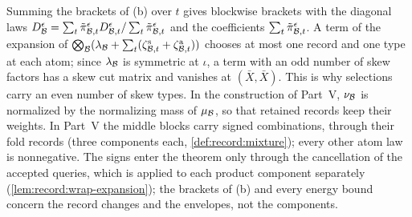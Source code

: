 Summing the brackets of (b) over $t$ gives blockwise brackets with the
diagonal laws $D^\epsilon_{\mathcal B}=\sum_t\tilde\pi^\epsilon_{\mathcal B,t}
D^\epsilon_{\mathcal B,t}/\sum_t\tilde\pi^\epsilon_{\mathcal B,t}$ and the coefficients
$\sum_t\tilde\pi^\epsilon_{\mathcal B,t}$. A term of the expansion of
$\bigotimes_{\mathcal B}(\lambda_{\mathcal B}+\sum_t(\zeta^{\rm s}_{\mathcal B,t}+\zeta^{\rm
a}_{\mathcal B,t}))$ chooses at most one record and one type at each atom; since
$\lambda_{\mathcal B}$ is symmetric at $\iota$, a term with an odd number of skew
factors has a skew cut matrix and vanishes at $(\bar X,\bar X)$. This is why
selections carry an even number of skew types. In the construction of
Part~V, $\nu_{\mathcal B}$ is normalized by the normalizing mass of $\mu_{\mathcal B}$, so
that retained records keep their weights. In Part~V the middle blocks carry
signed combinations, through their fold records (three components each,
\cref{def:record:mixture}); every other atom law is nonnegative. The signs
enter the theorem only through the cancellation of the accepted queries,
which is applied to each product component separately
(\cref{lem:record:wrap-expansion}); the brackets of (b) and every energy
bound concern the record changes and the envelopes, not the components.


